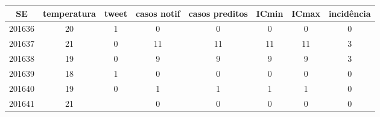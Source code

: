 \begin{tabular}{c|ccccccc}
  \hline
SE & temperatura & tweet & casos notif & casos preditos & ICmin & ICmax & incidência \\ 
  \hline
201636 & 20 & 1 & 0 & 0 & 0 & 0 & 0 \\ 
  201637 & 21 & 0 & 11 & 11 & 11 & 11 & 3 \\ 
  201638 & 19 & 0 & 9 & 9 & 9 & 9 & 3 \\ 
  201639 & 18 & 1 & 0 & 0 & 0 & 0 & 0 \\ 
  201640 & 19 & 0 & 1 & 1 & 1 & 1 & 0 \\ 
  201641 & 21 &  & 0 & 0 & 0 & 0 & 0 \\ 
   \hline
\end{tabular}
